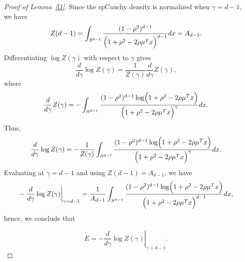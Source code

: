 \documentclass{article}
\begin{document}
\begin{proof}[Proof of Lemma~\ref{l1}]
Since the spCauchy density is normalized when \(\gamma=d-1\), we have
\[
Z(d-1)=\int_{S^{d-1}} \frac{(1-\rho^2)^{d-1}}{\Bigl(1+\rho^2-2\rho\mu^T x\Bigr)^{d-1}}dx = A_{d-1}.
\]
Differentiating \(\log Z(\gamma)\) with respect to \(\gamma\) gives
\[
\frac{d}{d\gamma}\log Z(\gamma)=\frac{1}{Z(\gamma)}\frac{d}{d\gamma}Z(\gamma),
\]
where
\[
\frac{d}{d\gamma}Z(\gamma)=-\int_{S^{d-1}} \frac{(1-\rho^2)^{d-1}\log\Bigl(1+\rho^2-2\rho\mu^T x\Bigr)}{\Bigl(1+\rho^2-2\rho\mu^T x\Bigr)^{\gamma}}dx.
\]
Thus,
\[
\frac{d}{d\gamma}\log Z(\gamma) = -\frac{1}{Z(\gamma)}\int_{S^{d-1}} \frac{(1-\rho^2)^{d-1}\log\Bigl(1+\rho^2-2\rho\mu^T x\Bigr)}{\Bigl(1+\rho^2-2\rho\mu^T x\Bigr)^{\gamma}}dx.
\]
Evaluating at \(\gamma=d-1\) and using \(Z(d-1)=A_{d-1}\), we have
\[
-\left.\frac{d}{d\gamma}\log Z(\gamma)\right|_{\gamma=d-1}=\frac{1}{A_{d-1}}\int_{S^{d-1}} \frac{(1-\rho^2)^{d-1}\log\Bigl(1+\rho^2-2\rho\mu^T x\Bigr)}{\Bigl(1+\rho^2-2\rho\mu^T x\Bigr)^{d-1}}dx,
\]
hence, we conclude that

\[
E=-\left.\frac{d}{d\gamma}\log Z(\gamma)\right|_{\gamma=d-1}.
\]
\end{proof}
\end{document}
